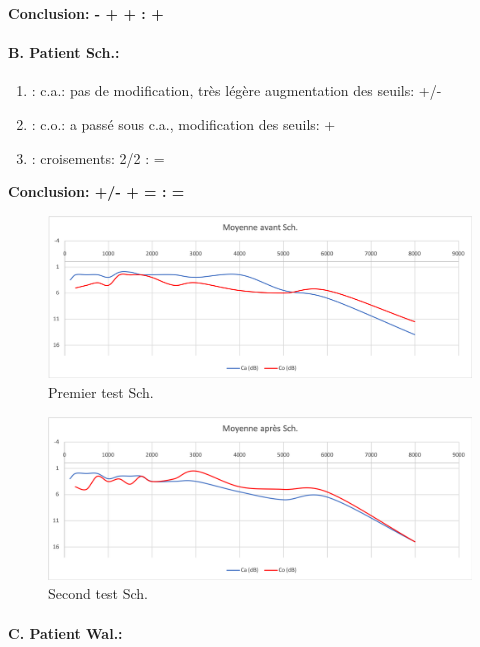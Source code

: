                 \textbf{  Conclusion:  -    +    +       :  +}




\paragraph{B. Patient Sch.:}

	\begin{enumerate}

 		\item : c.a.: pas de modification, très légère augmentation des
                  seuils: +/-
 		\item : c.o.: a passé sous c.a., modification des seuils: +
 		\item : croisements: 2/2 :     =
                   \end{enumerate}
 \textbf{  Conclusion:  +/-    +    =        :  =}

\begin{figure}[th]
\centering
\includegraphics[width=0.7\linewidth]{images/graphiques/schaff_pre.png}
\caption[Moyenne OG+OD]{Premier test Sch.}

\end{figure}


         \begin{figure}[th]
\centering
\includegraphics[width=0.7\linewidth]{images/graphiques/schaff_post.png}
\caption[Moyenne OG+OD]{Second test Sch.}

\label{groupecontroleimage1}
\end{figure}


\paragraph{C. Patient Wal.:}



